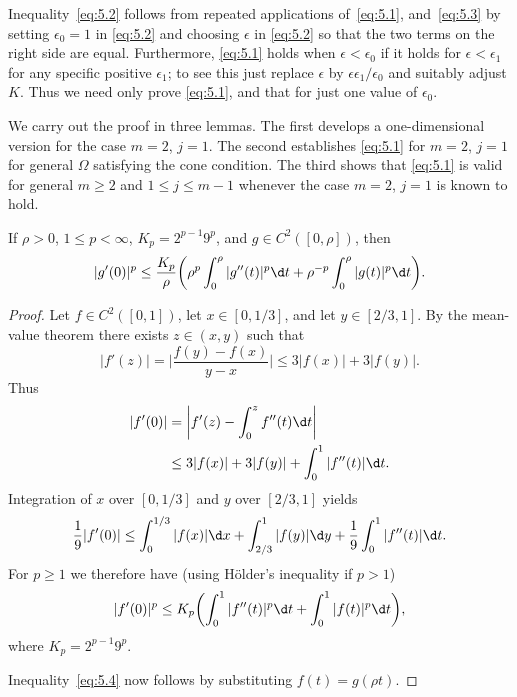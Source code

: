 \begin{para}
  Inequality~\eqref{eq:5.2} follows from repeated applications of~\eqref{eq:5.1},
  and~\eqref{eq:5.3} by setting $\epsilon_0=1$ in \eqref{eq:5.2} and choosing
  $\epsilon$ in \eqref{eq:5.2} so that the two terms on the right side are equal.
  Furthermore, \eqref{eq:5.1} holds when $\epsilon<\epsilon_0$ if it holds for
  $\epsilon<\epsilon_1$ for any specific positive $\epsilon_1$; to see this just
  replace $\epsilon$ by $\epsilon\epsilon_1/\epsilon_0$ and suitably adjust $K$.
  Thus we need only prove \eqref{eq:5.1}, and that for just one value of $\epsilon_0$.

  We carry out the proof in three lemmas. The first develops a one-dimensional
  version for the case $m=2$, $j=1$. The second establishes \eqref{eq:5.1}
  for $m=2$, $j=1$ for general $\Omega$ satisfying the cone condition. The third
  shows that \eqref{eq:5.1} is valid for general $m\geq 2$ and $1\leq j\leq m-1$
  whenever the case $m=2$, $j=1$ is known to hold.
\end{para}


\begin{lemma}
  If $\rho>0$, $1\leq p<\infty$, $K_p=2^{p-1} 9^p$, and $g\in C^2([0,\rho])$, then
  \begin{equation}\label{eq:5.4}
    |g'(0)|^p \leq \frac{K_p}{\rho} \biggl(\rho^p \int_0^\rho |g''(t)|^p
      \d t + \rho^{-p} \int_0^\rho |g(t)|^p \d t\biggr).
  \end{equation}
\end{lemma}

\begin{proof}
  Let $f\in C^2([0,1])$, let $x\in [0,1/3]$, and let $y\in [2/3,1]$.
  By the mean-value theorem there exists $z\in (x,y)$ such that
  \[ |f'(z)| = \biggl|\frac{f(y)-f(x)}{y-x}\biggr| \leq 3|f(x)| + 3|f(y)|. \]
  Thus
  \begin{align*}
    |f'(0)|
    & = \biggl|f'(z) - \int_0^z f''(t) \d t\biggr| \\
    & \leq 3|f(x)| + 3|f(y)| + \int_0^1 |f''(t)| \d t.
  \end{align*}
  Integration of $x$ over $[0,1/3]$ and $y$ over $[2/3,1]$ yields
  \[ \frac19 |f'(0)| \leq \int_0^{1/3} |f(x)| \d x
      + \int_{2/3}^1 |f(y)|\d y + \frac19 \int_0^1 |f''(t)| \d t. \]
  For $p\geq 1$ we therefore have (using H\"older's inequality if $p>1$)
  \[ |f'(0)|^p \leq K_p \biggl(\int_0^1 |f''(t)|^p \d t
      + \int_0^1 |f(t)|^p \d t\biggr), \]
  where $K_p = 2^{p-1}9^p$.

  Inequality~\eqref{eq:5.4} now follows by substituting $f(t) = g(\rho t)$.
\end{proof}


